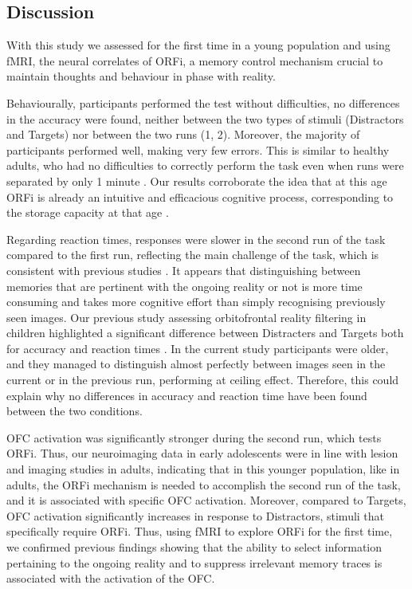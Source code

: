 \subsection{Discussion}
With this study we assessed for the first time in a young population and using fMRI, the neural correlates of ORFi, a memory control mechanism crucial to maintain thoughts and behaviour in phase with reality.

Behaviourally, participants performed the test without difficulties, no differences in the accuracy were found, neither between the two types of stimuli (Distractors and Targets) nor between the two runs (1, 2). Moreover, the majority of participants performed well, making very few errors. This is similar to healthy adults, who had no difficulties to correctly perform the task even when runs were separated by only 1 minute \citep{Schnider1999, Wahlen2011}. Our results corroborate the idea that at this age ORFi is already an intuitive and efficacious cognitive process, corresponding to the storage capacity at that age \citep{Liverani2017}. 

Regarding reaction times, responses were slower in the second run of the task compared to the first run, reflecting the main challenge of the task, which is consistent with previous studies \citep{Bouzerda-Wahlen2015, Liverani2016, Liverani2017}. It appears that distinguishing between memories that are pertinent with the ongoing reality or not is more time consuming and takes more cognitive effort than simply recognising previously seen images. Our previous study assessing orbitofrontal reality filtering in children highlighted a significant difference between Distracters and Targets both for accuracy and reaction times \citep{Liverani2017}. In the current study participants were older, and they managed to distinguish almost perfectly between images seen in the current or in the previous run, performing at ceiling effect. Therefore, this could explain why no differences in accuracy and reaction time have been found between the two conditions. 

OFC activation was significantly stronger during the second run, which tests ORFi. Thus, our neuroimaging data in early adolescents were in line with lesion and imaging studies in adults, indicating that in this younger population, like in adults, the ORFi mechanism is needed to accomplish the second run of the task, and it is associated with specific OFC activation. Moreover, compared to Targets, OFC activation significantly increases in response to Distractors, stimuli that specifically require ORFi. Thus, using fMRI to explore ORFi for the first time, we confirmed previous findings showing that the ability to select information pertaining to the ongoing reality and to suppress irrelevant memory traces is associated with the activation of the OFC. 

